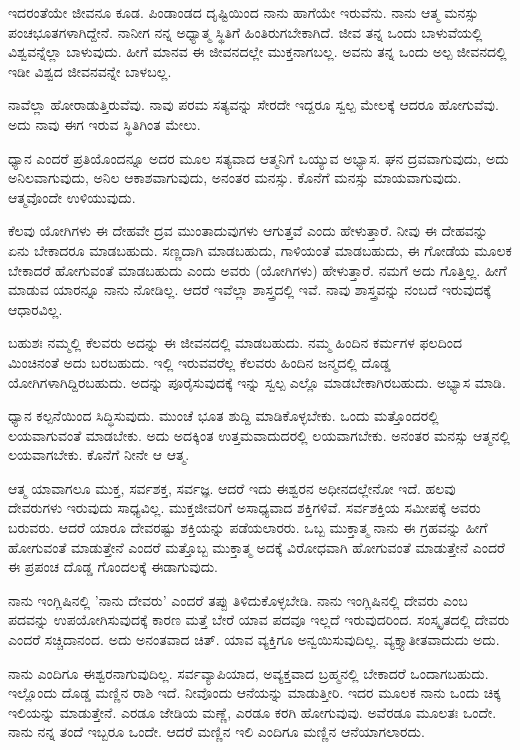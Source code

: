 ಇದರಂತೆಯೇ ಜೀವನೂ ಕೂಡ. ಪಿಂಡಾಂಡದ ದೃಷ್ಟಿಯಿಂದ ನಾನು ಹಾಗೆಯೇ ಇರುವೆನು. ನಾನು ಆತ್ಮ ಮನಸ್ಸು ಪಂಚಭೂತಗಳಾಗಿದ್ದೇನೆ. ನಾನೀಗ ನನ್ನ ಅಧ್ಯಾತ್ಮ ಸ್ಥಿತಿಗೆ ಹಿಂತಿರುಗಬೇಕಾಗಿದೆ. ಜೀವ ತನ್ನ ಒಂದು ಬಾಳುವೆಯಲ್ಲಿ ವಿಶ್ವವನ್ನೆಲ್ಲಾ ಬಾಳುವುದು. ಹೀಗೆ ಮಾನವ ಈ ಜೀವನದಲ್ಲೇ ಮುಕ್ತನಾಗಬಲ್ಲ. ಅವನು ತನ್ನ ಒಂದು ಅಲ್ಪ ಜೀವನದಲ್ಲಿ ಇಡೀ ವಿಶ್ವದ ಜೀವನವನ್ನೇ ಬಾಳಬಲ್ಲ.

\newpage

ನಾವೆಲ್ಲಾ ಹೋರಾಡುತ್ತಿರುವೆವು. ನಾವು ಪರಮ ಸತ್ಯವನ್ನು ಸೇರದೇ ಇದ್ದರೂ ಸ್ವಲ್ಪ ಮೇಲಕ್ಕೆ ಆದರೂ ಹೋಗುವೆವು. ಅದು ನಾವು ಈಗ ಇರುವ ಸ್ಥಿತಿಗಿಂತ ಮೇಲು.

ಧ್ಯಾನ ಎಂದರೆ ಪ್ರತಿಯೊಂದನ್ನೂ ಅದರ ಮೂಲ ಸತ್ಯವಾದ ಆತ್ಮನಿಗೆ ಒಯ್ಯುವ ಅಭ್ಯಾಸ. ಘನ ದ್ರವವಾಗುವುದು, ಅದು ಅನಿಲವಾಗುವುದು, ಅನಿಲ ಆಕಾಶವಾಗುವುದು, ಅನಂತರ ಮನಸ್ಸು. ಕೊನೆಗೆ ಮನಸ್ಸು ಮಾಯವಾಗುವುದು. ಆತ್ಮವೊಂದೇ ಉಳಿಯುವುದು.

ಕೆಲವು ಯೋಗಿಗಳು ಈ ದೇಹವೇ ದ್ರವ ಮುಂತಾದುವುಗಳು ಆಗುತ್ತವೆ ಎಂದು ಹೇಳುತ್ತಾರೆ. ನೀವು ಈ ದೇಹವನ್ನು ಏನು ಬೇಕಾದರೂ ಮಾಡಬಹುದು. ಸಣ್ಣದಾಗಿ ಮಾಡಬಹುದು, ಗಾಳಿಯಂತೆ ಮಾಡಬಹುದು, ಈ ಗೋಡೆಯ ಮೂಲಕ ಬೇಕಾದರೆ ಹೋಗುವಂತೆ ಮಾಡಬಹುದು ಎಂದು ಅವರು (ಯೋಗಿಗಳು) ಹೇಳುತ್ತಾರೆ. ನಮಗೆ ಅದು ಗೊತ್ತಿಲ್ಲ. ಹೀಗೆ ಮಾಡುವ ಯಾರನ್ನೂ ನಾನು ನೋಡಿಲ್ಲ. ಆದರೆ ಇವೆಲ್ಲಾ ಶಾಸ್ತ್ರದಲ್ಲಿ ಇವೆ. ನಾವು ಶಾಸ್ತ್ರವನ್ನು ನಂಬದೆ ಇರುವುದಕ್ಕೆ ಆಧಾರವಿಲ್ಲ.

ಬಹುಶಃ ನಮ್ಮಲ್ಲಿ ಕೆಲವರು ಅದನ್ನು ಈ ಜೀವನದಲ್ಲಿ ಮಾಡಬಹುದು. ನಮ್ಮ ಹಿಂದಿನ ಕರ್ಮಗಳ ಫಲದಿಂದ ಮಿಂಚಿನಂತೆ ಅದು ಬರಬಹುದು. ಇಲ್ಲಿ ಇರುವವರೆಲ್ಲ ಕೆಲವರು ಹಿಂದಿನ ಜನ್ಮದಲ್ಲಿ ದೊಡ್ಡ ಯೋಗಿಗಳಾಗಿದ್ದಿರಬಹುದು. ಅದನ್ನು ಪೂರೈಸುವುದಕ್ಕೆ ಇನ್ನು ಸ್ವಲ್ಪ ಎಲ್ಲೊ ಮಾಡಬೇಕಾಗಿರಬಹುದು. ಅಭ್ಯಾಸ ಮಾಡಿ.

ಧ್ಯಾನ ಕಲ್ಪನೆಯಿಂದ ಸಿದ್ಧಿಸುವುದು. ಮುಂಚೆ ಭೂತ ಶುದ್ದಿ ಮಾಡಿಕೊಳ್ಳಬೇಕು. ಒಂದು ಮತ್ತೊಂದರಲ್ಲಿ ಲಯವಾಗುವಂತೆ ಮಾಡಬೇಕು. ಅದು ಅದಕ್ಕಿಂತ ಉತ್ತಮವಾದುದರಲ್ಲಿ ಲಯವಾಗಬೇಕು. ಅನಂತರ ಮನಸ್ಸು ಆತ್ಮನಲ್ಲಿ ಲಯವಾಗಬೇಕು. ಕೊನೆಗೆ ನೀನೇ ಆ ಆತ್ಮ.

ಆತ್ಮ ಯಾವಾಗಲೂ ಮುಕ್ತ, ಸರ್ವಶಕ್ತ, ಸರ್ವಜ್ಞ. ಆದರೆ ಇದು ಈಶ್ವರನ ಅಧೀನದಲ್ಲೇನೋ ಇದೆ. ಹಲವು ದೇವರುಗಳು ಇರುವುದು ಸಾಧ್ಯವಿಲ್ಲ. ಮುಕ್ತಜೀವರಿಗೆ ಅಸಾಧ್ಯವಾದ ಶಕ್ತಿಗಳಿವೆ. ಸರ್ವಶಕ್ತಿಯ ಸಮೀಪಕ್ಕೆ ಅವರು ಬರುವರು. ಆದರೆ ಯಾರೂ ದೇವರಷ್ಟು ಶಕ್ತಿಯನ್ನು ಪಡೆಯಲಾರರು. ಒಬ್ಬ ಮುಕ್ತಾತ್ಮ ನಾನು ಈ ಗ್ರಹವನ್ನು ಹೀಗೆ ಹೋಗುವಂತೆ ಮಾಡುತ್ತೇನೆ ಎಂದರೆ ಮತ್ತೊಬ್ಬ ಮುಕ್ತಾತ್ಮ ಅದಕ್ಕೆ ವಿರೋಧವಾಗಿ ಹೋಗುವಂತೆ ಮಾಡುತ್ತೇನೆ ಎಂದರೆ ಈ ಪ್ರಪಂಚ ದೊಡ್ಡ ಗೊಂದಲಕ್ಕೆ ಈಡಾಗುವುದು.

ನಾನು ಇಂಗ್ಲಿಷಿನಲ್ಲಿ 'ನಾನು ದೇವರು' ಎಂದರೆ ತಪ್ಪು ತಿಳಿದುಕೊಳ್ಳಬೇಡಿ. ನಾನು ಇಂಗ್ಲಿಷಿನಲ್ಲಿ ದೇವರು ಎಂಬ ಪದವನ್ನು ಉಪಯೋಗಿಸುವುದಕ್ಕೆ ಕಾರಣ ಮತ್ತೆ ಬೇರೆ ಯಾವ ಪದವೂ ಇಲ್ಲದೆ ಇರುವುದರಿಂದ. ಸಂಸ್ಕೃತದಲ್ಲಿ ದೇವರು ಎಂದರೆ ಸಚ್ಚಿದಾನಂದ. ಅದು ಅನಂತವಾದ ಚಿತ್. ಯಾವ ವ್ಯಕ್ತಿಗೂ ಅನ್ವಯಿಸುವುದಿಲ್ಲ. ವ್ಯಕ್ತ್ಯಾತೀತವಾದುದು ಅದು.

ನಾನು ಎಂದಿಗೂ ಈಶ್ವರನಾಗುವುದಿಲ್ಲ. ಸರ್ವವ್ಯಾಪಿಯಾದ, ಅವ್ಯಕ್ತವಾದ ಬ್ರಹ್ಮನಲ್ಲಿ ಬೇಕಾದರೆ ಒಂದಾಗಬಹುದು. ಇಲ್ಲೊಂದು ದೊಡ್ಡ ಮಣ್ಣಿನ ರಾಶಿ ಇದೆ. ನೀವೊಂದು ಆನೆಯನ್ನು ಮಾಡುತ್ತೀರಿ. ಇದರ ಮೂಲಕ ನಾನು ಒಂದು ಚಿಕ್ಕ ಇಲಿಯನ್ನು ಮಾಡುತ್ತೇನೆ. ಎರಡೂ ಜೇಡಿಯ ಮಣ್ಣೆ, ಎರಡೂ ಕರಗಿ ಹೋಗುವುವು. ಅವೆರಡೂ ಮೂಲತಃ ಒಂದೇ. ನಾನು ನನ್ನ ತಂದೆ ಇಬ್ಬರೂ ಒಂದೇ. ಆದರೆ ಮಣ್ಣಿನ ಇಲಿ ಎಂದಿಗೂ ಮಣ್ಣಿನ ಆನೆಯಾಗಲಾರದು.

